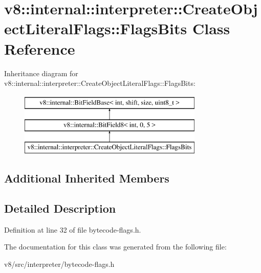 \hypertarget{classv8_1_1internal_1_1interpreter_1_1CreateObjectLiteralFlags_1_1FlagsBits}{}\section{v8\+:\+:internal\+:\+:interpreter\+:\+:Create\+Object\+Literal\+Flags\+:\+:Flags\+Bits Class Reference}
\label{classv8_1_1internal_1_1interpreter_1_1CreateObjectLiteralFlags_1_1FlagsBits}
Inheritance diagram for v8\+:\+:internal\+:\+:interpreter\+:\+:Create\+Object\+Literal\+Flags\+:\+:Flags\+Bits\+:\begin{figure}[H]
\begin{center}
\leavevmode
\includegraphics[height=3.000000cm]{classv8_1_1internal_1_1interpreter_1_1CreateObjectLiteralFlags_1_1FlagsBits}
\end{center}
\end{figure}
\subsection*{Additional Inherited Members}


\subsection{Detailed Description}


Definition at line 32 of file bytecode-\/flags.\+h.



The documentation for this class was generated from the following file\+:\begin{DoxyCompactItemize}
\item 
v8/src/interpreter/bytecode-\/flags.\+h\end{DoxyCompactItemize}
